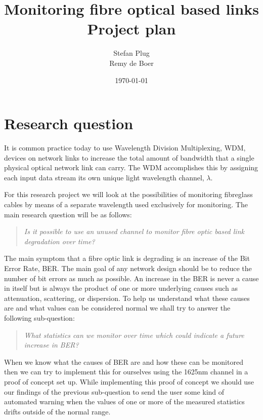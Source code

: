 \documentclass{article}
\begin{document}
\title{Monitoring fibre optical based links\\Project plan}
\author{Stefan Plug\\Remy de Boer}
\date{\today}
\maketitle

\section{Research question}
It is common practice today to use Wavelength Division Multiplexing, WDM, devices on network links to increase the total amount of bandwidth that a single physical optical network link can carry. The WDM accomplishes this by assigning each input data stream its own unique light wavelength channel, $\lambda$. 

For this research project we will look at the possibilities of monitoring fibreglass cables by means of a separate wavelength used exclusively for monitoring. 
The main research question will be as follows:
\begin{quote}
\textit{
Is it possible to use an unused channel to monitor fibre optic based link degradation over time?
}
\end{quote}

The main symptom that a fibre optic link is degrading is an increase of the Bit Error Rate, BER.
The main goal of any network design should be to reduce the number of bit errors as much as possible.
An increase in the BER is never a cause in itself but is always the product of one or more underlying causes such as attenuation, scattering, or dispersion. To help us understand what these causes are and what values can be considered normal we shall try to answer the following sub-question:
\begin{quote}
\textit{
What statistics can we monitor over time which could indicate a future increase in BER?
}
\end{quote}
When we know what the causes of BER are and how these can be monitored then we can try to implement this for ourselves using the 1625nm channel in a proof of concept set up. 
While implementing this proof of concept we should use our findings of the previous sub-question to send the user some kind of automated warning when the values of one or more of the measured statistics drifts outside of the normal range.
\end{document}
